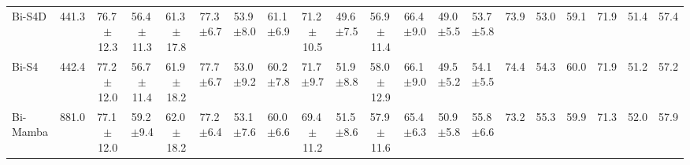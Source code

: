 \documentclass[sigconf,nonacm]{acmart}
\begin{document}
\begin{table}[t]
{\begin{tabular}{lccccccccccccccccccc}
    Bi-S4D & 441.3
      & 76.7{\scriptsize\,$\pm$12.3} & 56.4{\scriptsize\,$\pm$11.3} & 61.3{\scriptsize\,$\pm$17.8}
      & 77.3{\scriptsize\,$\pm$6.7}  & 53.9{\scriptsize\,$\pm$8.0}  & 61.1{\scriptsize\,$\pm$6.9}
      & 71.2{\scriptsize\,$\pm$10.5} & 49.6{\scriptsize\,$\pm$7.5}  & 56.9{\scriptsize\,$\pm$11.4}
      & 66.4{\scriptsize\,$\pm$9.0}  & 49.0{\scriptsize\,$\pm$5.5}  & 53.7{\scriptsize\,$\pm$5.8}
      & 73.9 & 53.0 & 59.1 & 71.9 & 51.4 & 57.4 \\
    Bi-S4 & 442.4
      & 77.2{\scriptsize\,$\pm$12.0} & 56.7{\scriptsize\,$\pm$11.4} & 61.9{\scriptsize\,$\pm$18.2}
      & 77.7{\scriptsize\,$\pm$6.7}  & 53.0{\scriptsize\,$\pm$9.2}  & 60.2{\scriptsize\,$\pm$7.8}
      & 71.7{\scriptsize\,$\pm$9.7}  & 51.9{\scriptsize\,$\pm$8.8}  & 58.0{\scriptsize\,$\pm$12.9}
      & 66.1{\scriptsize\,$\pm$9.0}  & 49.5{\scriptsize\,$\pm$5.2}  & 54.1{\scriptsize\,$\pm$5.5}
      & 74.4 & 54.3 & 60.0 & 71.9 & 51.2 & 57.2 \\
    Bi-Mamba & 881.0
      & 77.1{\scriptsize\,$\pm$12.0} & 59.2{\scriptsize\,$\pm$9.4}  & 62.0{\scriptsize\,$\pm$18.2}
      & 77.2{\scriptsize\,$\pm$6.4}  & 53.1{\scriptsize\,$\pm$7.6}  & 60.0{\scriptsize\,$\pm$6.6}
      & 69.4{\scriptsize\,$\pm$11.2} & 51.5{\scriptsize\,$\pm$8.6}  & 57.9{\scriptsize\,$\pm$11.6}
      & 65.4{\scriptsize\,$\pm$6.3}  & 50.9{\scriptsize\,$\pm$5.8}  & 55.8{\scriptsize\,$\pm$6.6}
      & 73.2 & 55.3 & 59.9 & 71.3 & 52.0 & 57.9 \\
    \bottomrule
  \end{tabular}%
  }
\end{table}
\end{document}
